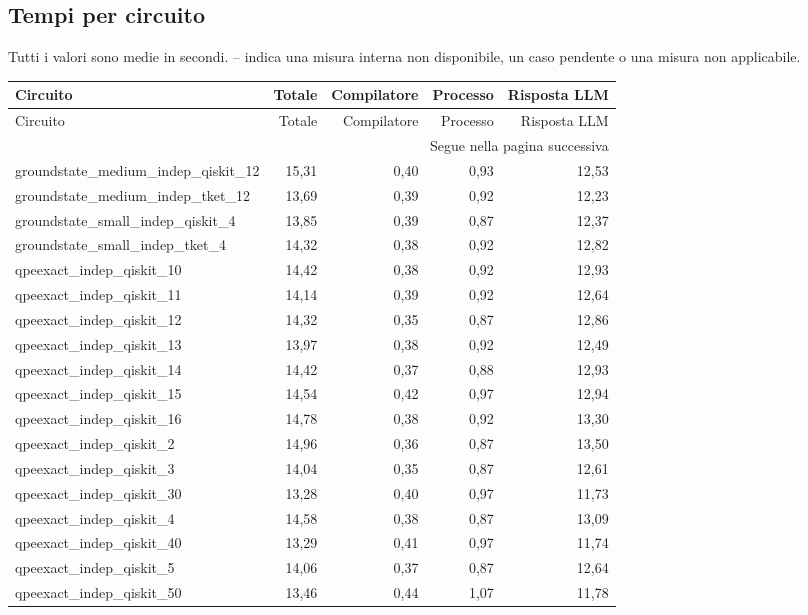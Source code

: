 \subsection{Tempi per circuito}
Tutti i valori sono medie in secondi. -- indica una misura interna non disponibile, un caso pendente o una misura non applicabile.
\begingroup\footnotesize
\setlength{\tabcolsep}{5pt}
\begin{longtable}{lrrrr}
\toprule
Circuito & Totale & Compilatore & Processo & Risposta LLM \\
\midrule
\endfirsthead
\toprule
Circuito & Totale & Compilatore & Processo & Risposta LLM \\
\midrule\endhead
\midrule\multicolumn{5}{r}{\footnotesize Segue nella pagina successiva}\\
\endfoot
\bottomrule\endlastfoot
groundstate\_medium\_indep\_qiskit\_12 & 15,31 & 0,40 & 0,93 & 12,53 \\
groundstate\_medium\_indep\_tket\_12 & 13,69 & 0,39 & 0,92 & 12,23 \\
groundstate\_small\_indep\_qiskit\_4 & 13,85 & 0,39 & 0,87 & 12,37 \\
groundstate\_small\_indep\_tket\_4 & 14,32 & 0,38 & 0,92 & 12,82 \\
qpeexact\_indep\_qiskit\_10 & 14,42 & 0,38 & 0,92 & 12,93 \\
qpeexact\_indep\_qiskit\_11 & 14,14 & 0,39 & 0,92 & 12,64 \\
qpeexact\_indep\_qiskit\_12 & 14,32 & 0,35 & 0,87 & 12,86 \\
qpeexact\_indep\_qiskit\_13 & 13,97 & 0,38 & 0,92 & 12,49 \\
qpeexact\_indep\_qiskit\_14 & 14,42 & 0,37 & 0,88 & 12,93 \\
qpeexact\_indep\_qiskit\_15 & 14,54 & 0,42 & 0,97 & 12,94 \\
qpeexact\_indep\_qiskit\_16 & 14,78 & 0,38 & 0,92 & 13,30 \\
qpeexact\_indep\_qiskit\_2 & 14,96 & 0,36 & 0,87 & 13,50 \\
qpeexact\_indep\_qiskit\_3 & 14,04 & 0,35 & 0,87 & 12,61 \\
qpeexact\_indep\_qiskit\_30 & 13,28 & 0,40 & 0,97 & 11,73 \\
qpeexact\_indep\_qiskit\_4 & 14,58 & 0,38 & 0,87 & 13,09 \\
qpeexact\_indep\_qiskit\_40 & 13,29 & 0,41 & 0,97 & 11,74 \\
qpeexact\_indep\_qiskit\_5 & 14,06 & 0,37 & 0,87 & 12,64 \\
qpeexact\_indep\_qiskit\_50 & 13,46 & 0,44 & 1,07 & 11,78 \\

\end{longtable}

